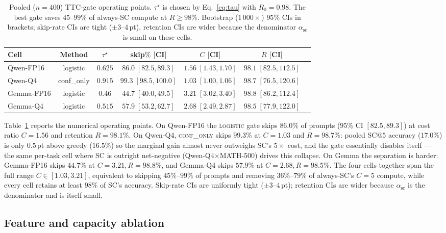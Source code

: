 \documentclass[11pt]{article}
\begin{document}
\begin{table}[t]
\centering\small
\begin{tabular}{lcccccc}
\toprule
Cell & Method & $\tau^{\star}$ & skip$\%$ $[$CI$]$ & $C$ $[$CI$]$ & $R$ $[$CI$]$ \\
\midrule
Qwen-FP16  & logistic   & $0.625$ & $86.0\;[82.5, 89.3]$ & $1.56\;[1.43, 1.70]$ & $98.1\;[82.5, 112.5]$ \\
Qwen-Q4    & conf\_only & $0.915$ & $99.3\;[98.5, 100.0]$ & $1.03\;[1.00, 1.06]$ & $98.7\;[76.5, 120.6]$ \\
Gemma-FP16 & logistic   & $0.46$  & $44.7\;[40.0, 49.5]$ & $3.21\;[3.02, 3.40]$ & $98.8\;[86.2, 112.4]$ \\
Gemma-Q4   & logistic   & $0.515$ & $57.9\;[53.2, 62.7]$ & $2.68\;[2.49, 2.87]$ & $98.5\;[77.9, 122.0]$ \\
\bottomrule
\end{tabular}
\caption{Pooled ($n{=}400$) TTC-gate operating points. $\tau^{\star}$
is chosen by Eq.~\ref{eq:tau} with $R_0=0.98$. The best gate saves
$45$--$99\%$ of always-SC compute at $R\ge 98\%$. Bootstrap
($1\,000{\times}$) $95\%$ CIs in brackets; skip-rate CIs are tight
($\pm 3$--$4$\,pt), retention CIs are wider because the denominator
$\alpha_\mathrm{sc}$ is small on these cells.}
\label{tab:gate-pooled}
\end{table}

Table~\ref{tab:gate-pooled} reports the numerical operating points.
On Qwen-FP16 the \textsc{logistic} gate skips $86.0\%$ of prompts
($95\%$ CI $[82.5,89.3]$) at cost ratio $C{=}1.56$ and retention
$R{=}98.1\%$. On Qwen-Q4, \textsc{conf\_only} skips $99.3\%$ at
$C{=}1.03$ and $R{=}98.7\%$: pooled SC@$5$ accuracy ($17.0\%$) is
only $0.5$\,pt above greedy ($16.5\%$) so the marginal gain almost
never outweighs SC's $5\times$ cost, and the gate essentially
disables itself --- the same per-task cell where SC is outright
net-negative (Qwen-Q4${\times}$MATH-500) drives this collapse. On Gemma
the separation is harder: Gemma-FP16 skips $44.7\%$ at
$C{=}3.21,R{=}98.8\%$, and Gemma-Q4 skips $57.9\%$ at
$C{=}2.68,R{=}98.5\%$. The four cells together span the full range
$C\in[1.03,3.21]$, equivalent to skipping $45\%$--$99\%$ of prompts
and removing $36\%$--$79\%$ of always-SC's $C{=}5$ compute, while
every cell retains at least $98\%$ of SC's accuracy. Skip-rate CIs are uniformly tight ($\pm 3$--$4$\,pt);
retention CIs are wider because $\alpha_\mathrm{sc}$ is the
denominator and is itself small.

\subsection{Feature and capacity ablation}
\label{sec:ablation}
\end{document}
